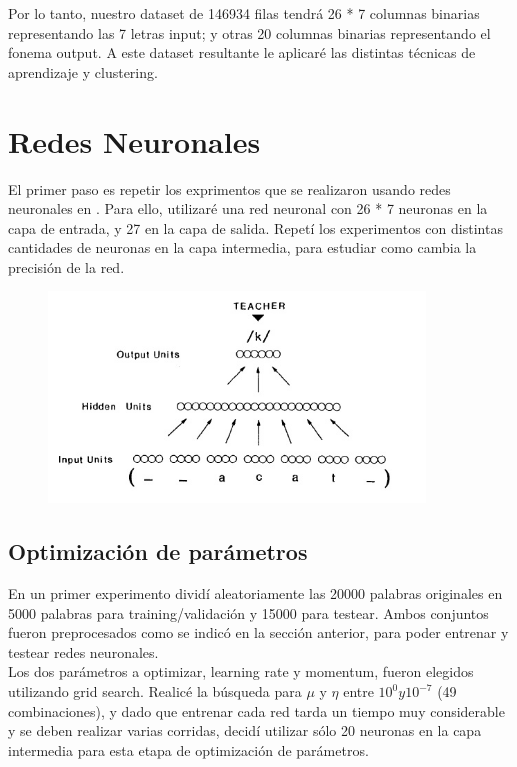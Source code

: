 \documentclass[paper=a4, fontsize=11pt]{scrartcl} %
\numberwithin{equation}{section} %
\numberwithin{figure}{section} %
\numberwithin{table}{section} %
\begin{document}
Por lo tanto, nuestro dataset de 146934 filas tendrá 26 * 7 columnas binarias representando las 7 letras input; y otras 20 columnas binarias representando el fonema output. A este dataset resultante le aplicaré las distintas técnicas de aprendizaje y clustering.

\section{Redes Neuronales}
El primer paso es repetir los exprimentos que se realizaron usando redes neuronales en \cite{parallel}. Para ello, utilizaré una red neuronal con 26 * 7 neuronas en la capa de entrada, y 27 en la capa de salida. Repetí los experimentos con distintas cantidades de neuronas en la capa intermedia, para estudiar como cambia la precisión de la red.

\begin{figure}[h!]
\centering
\includegraphics[width=100mm]{figure1.jpg}
\end{figure}


\subsection{Optimización de parámetros}

En un primer experimento dividí aleatoriamente las 20000 palabras originales en 5000 palabras para training/validación y 15000 para testear. Ambos conjuntos fueron preprocesados como se indicó en la sección anterior, para poder entrenar y testear redes neuronales. \\

Los dos parámetros a optimizar, learning rate y momentum, fueron elegidos utilizando grid search. Realicé la búsqueda para $\mu$ y $\eta$ entre  $10^0 y 10^{-7}$ (49 combinaciones), y dado que entrenar cada red tarda un tiempo muy considerable y se deben realizar varias corridas, decidí utilizar sólo 20 neuronas en la capa intermedia para esta etapa de optimización de parámetros. \\
\end{document}
